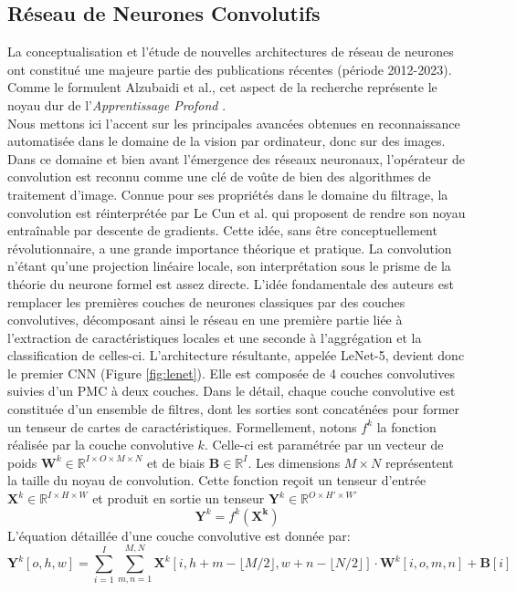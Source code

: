 \subsection{Réseau de Neurones Convolutifs}
\label{sec:ReseauxNeurones}
La conceptualisation et l'étude de nouvelles architectures de réseau de neurones ont constitué une majeure partie des publications récentes (période 2012-2023). Comme le formulent Alzubaidi et al., cet aspect de la recherche représente le noyau dur de l'\textit{Apprentissage Profond} \cite{alzubaidiReviewDeepLearning2021}.
\\
Nous mettons ici l'accent sur les principales avancées obtenues en reconnaissance automatisée dans le domaine de la vision par ordinateur, donc sur des images. Dans ce domaine et bien avant l'émergence des réseaux neuronaux, l'opérateur de convolution est reconnu comme une clé de voûte de bien des algorithmes de traitement d'image. Connue pour ses propriétés dans le domaine du filtrage, la convolution est réinterprétée par Le Cun et al. \cite{lecunGradientbasedLearningApplied1998} qui proposent de rendre son noyau entraînable par descente de gradients. Cette idée, sans être conceptuellement révolutionnaire, a une grande importance théorique et pratique. La convolution n'étant qu'une projection linéaire locale, son interprétation sous le prisme de la théorie du neurone formel est assez directe. L'idée fondamentale des auteurs est remplacer les premières couches de neurones classiques par des couches convolutives, décomposant ainsi le réseau en une première partie liée à l'extraction de caractéristiques locales et une seconde à l'aggrégation et la classification de celles-ci.
L'architecture résultante, appelée LeNet-5, devient donc le premier \ac{CNN} (Figure \ref{fig:lenet}). Elle est composée de 4 couches convolutives suivies d'un \ac{PMC} à deux couches. Dans le détail, chaque couche convolutive est constituée d'un ensemble de filtres, dont les sorties sont concaténées pour former un tenseur de cartes de caractéristiques. Formellement, notons $f^k$ la fonction réalisée par la couche convolutive $k$. Celle-ci est paramétrée par un vecteur de poids $\mathbf{W}^k \in \mathbb{R}^{I \times O \times M \times N}$ et de biais $\mathbf{B} \in \mathbb{R}^I$. Les dimensions $M \times N$ représentent la taille du noyau de convolution. Cette fonction reçoit un tenseur d'entrée $\mathbf{X}^k \in \mathbb{R}^{I \times H \times W}$ et produit en sortie un tenseur $\mathbf{Y}^k \in \mathbb{R}^{O \times H' \times W'}$ 
\begin{equation}
	\mathbf{Y}^k = f^k(\mathbf{X^k})
\end{equation}
L'équation détaillée d'une couche convolutive est donnée par:
\begin{equation}
	\mathbf{Y}^k[o, h, w] = \sum_{i=1}^{I}\sum_{m, n=1}^{M, N}\mathbf{X}^k[i, h +m - \lfloor M/2 \rfloor, w +n - \lfloor N/2 \rfloor] \cdot \mathbf{W}^k[i, o, m, n] + \mathbf{B}[i]
\end{equation}

